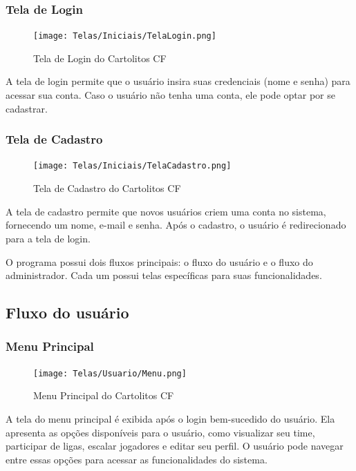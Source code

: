 \documentclass[12pt]{article}
\begin{document}
\subsubsection{Tela de Login}
\label{sec:tela_login}

\begin{figure}[H]
  \centering
  \texttt{[image: Telas/Iniciais/TelaLogin.png]}
  \caption{Tela de Login do Cartolitos CF}
  \label{fig:tela_login}
\end{figure}

A tela de login permite que o usuário insira suas credenciais (nome e senha) para acessar sua conta. Caso o usuário não tenha uma conta, ele pode optar por se cadastrar.

\subsubsection{Tela de Cadastro}
\label{sec:tela_cadastro}

\begin{figure}[H]
  \centering
  \texttt{[image: Telas/Iniciais/TelaCadastro.png]}
  \caption{Tela de Cadastro do Cartolitos CF}
  \label{fig:tela_cadastro}
\end{figure}
A tela de cadastro permite que novos usuários criem uma conta no sistema, fornecendo um nome, e-mail e senha. Após o cadastro, o usuário é redirecionado para a tela de login.

O programa possui dois fluxos principais: o fluxo do usuário e o fluxo do administrador. Cada um possui telas específicas para suas funcionalidades.

\subsection{Fluxo do usuário}
\label{sec:fluxo_usuario}
\subsubsection{Menu Principal}
\label{sec:menu_principal}

\begin{figure}[H]
  \centering
  \texttt{[image: Telas/Usuario/Menu.png]}
  \caption{Menu Principal do Cartolitos CF}
  \label{fig:menu_principal}
\end{figure}

A tela do menu principal é exibida após o login bem-sucedido do usuário. Ela apresenta as opções disponíveis para o usuário, como visualizar seu time, participar de ligas, escalar jogadores e editar seu perfil. O usuário pode navegar entre essas opções para acessar as funcionalidades do sistema.
\end{document}

